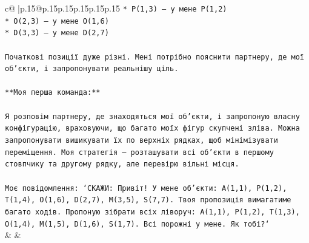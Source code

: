 \documentclass{article}
\begin{document}
{\begin{supertabular}{c@{$\;$}|p{.15\linewidth}@{}p{.15\linewidth}p{.15\linewidth}p{.15\linewidth}p{.15\linewidth}p{.15\linewidth}}
{{{\texttt{* P(1,3) – у мене P(1,2)} \\
\texttt{* O(2,3) – у мене O(1,6)} \\
\texttt{* D(3,3) – у мене D(2,7)} \\
\\ 
\texttt{Початкові позиції дуже різні. Мені потрібно пояснити партнеру, де мої об'єкти, і запропонувати реальнішу ціль.} \\
\\ 
\texttt{**Моя перша команда:**} \\
\\ 
\texttt{Я розповім партнеру, де знаходяться мої об'єкти, і запропоную власну конфігурацію, враховуючи, що багато моїх фігур скупчені зліва. Можна запропонувати вишикувати їх по верхніх рядках, щоб мінімізувати переміщення. Моя стратегія — розташувати всі об'єкти в першому стовпчику та другому рядку, але перевірю вільні місця.} \\
\\ 
\texttt{Моє повідомлення: `СКАЖИ: Привіт! У мене об'єкти: A(1,1), P(1,2), T(1,4), O(1,6), D(2,7), M(3,5), S(7,7). Твоя пропозиція вимагатиме багато ходів. Пропоную зібрати всіх ліворуч: A(1,1), P(1,2), T(1,3), O(1,4), M(1,5), D(1,6), S(1,7). Всі порожні у мене. Як тобі?`} \\
            }
        }
    }
    & & \\ \\


\end{supertabular}}
\end{document}
